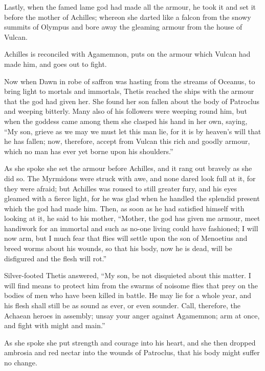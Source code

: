 Lastly, when the famed lame god had made all the armour, he took it and
set it before the mother of Achilles; whereon she darted like a falcon
from the snowy summits of Olympus and bore away the gleaming armour from
the house of Vulcan.


Achilles is reconciled with Agamemnon, puts on the armour which Vulcan had
made him, and goes out to fight.

Now when Dawn in robe of saffron was hasting from the streams of Oceanus,
to bring light to mortals and immortals, Thetis reached the ships with the
armour that the god had given her. She found her son fallen about the body
of Patroclus and weeping bitterly. Many also of his followers were weeping
round him, but when the goddess came among them she clasped his hand in
her own, saying, “My son, grieve as we may we must let this man lie, for
it is by heaven’s will that he has fallen; now, therefore, accept from
Vulcan this rich and goodly armour, which no man has ever yet borne upon
his shoulders.”

As she spoke she set the armour before Achilles, and it rang out bravely
as she did so. The Myrmidons were struck with awe, and none dared look
full at it, for they were afraid; but Achilles was roused to still greater
fury, and his eyes gleamed with a fierce light, for he was glad when he
handled the splendid present which the god had made him. Then, as soon as
he had satisfied himself with looking at it, he said to his mother,
“Mother, the god has given me armour, meet handiwork for an immortal and
such as no-one living could have fashioned; I will now arm, but I much
fear that flies will settle upon the son of Menoetius and breed worms
about his wounds, so that his body, now he is dead, will be disfigured and
the flesh will rot.”

Silver-footed Thetis answered, “My son, be not disquieted about this
matter. I will find means to protect him from the swarms of noisome flies
that prey on the bodies of men who have been killed in battle. He may lie
for a whole year, and his flesh shall still be as sound as ever, or even
sounder. Call, therefore, the Achaean heroes in assembly; unsay your anger
against Agamemnon; arm at once, and fight with might and main.”

As she spoke she put strength and courage into his heart, and she then
dropped ambrosia and red nectar into the wounds of Patroclus, that his
body might suffer no change.

